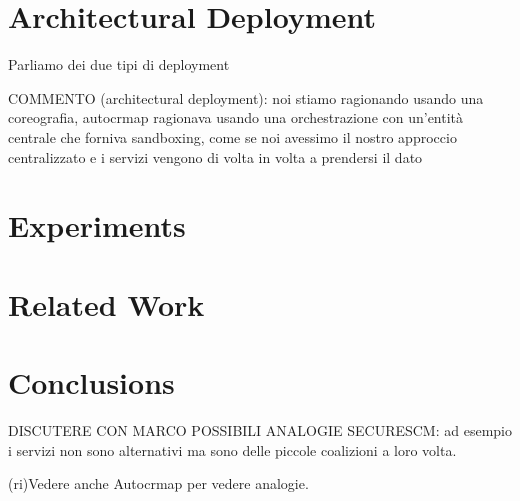 \documentclass[10pt,journal,compsoc]{IEEEtran}
\begin{document}
\section{Architectural Deployment}
Parliamo dei due tipi di deployment

COMMENTO (architectural deployment): noi stiamo ragionando usando una coreografia, autocrmap ragionava usando una orchestrazione con un’entità centrale che forniva sandboxing, come se noi avessimo il nostro approccio centralizzato e i servizi vengono di volta in volta a prendersi il dato

\section{Experiments}

\section{Related Work}

\section{Conclusions}
DISCUTERE CON MARCO POSSIBILI ANALOGIE SECURESCM: ad esempio i servizi non sono alternativi ma sono delle piccole coalizioni a loro volta.

(ri)Vedere anche Autocrmap per vedere analogie.



\end{document}
